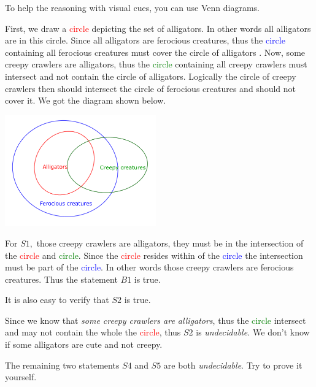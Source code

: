 \documentclass{article}
\begin{document}
\begin{soln}
    To help the reasoning with visual cues, you can use Venn diagrams.
    
    First, we draw a \textcolor{red}{circle} depicting the set of alligators. In other words all alligators are in this circle.
    Since all alligators are ferocious creatures, thus the \textcolor{blue}{circle} containing all ferocious creatures must cover the circle of alligators .
    Now, some creepy crawlers are alligators, thus the \textcolor{green}{circle} containing all creepy crawlers must intersect and not contain the circle of alligators.
    Logically the circle of creepy crawlers then should intersect the circle of ferocious creatures and should not cover it.
    We got the diagram shown below.

    \begin{center}
        \includegraphics[width=6.5cm]{./svg/pdf/pi-2023-01-03.pdf}
    \end{center}
    
    For $S1,$ those creepy crawlers are alligators, they must be in the intersection of the \textcolor{red}{circle} and \textcolor{green}{circle}.
    Since the \textcolor{red}{circle} resides within of the \textcolor{blue}{circle} the intersection must be part of the \textcolor{blue}{circle}.
    In other words those creepy crawlers are ferocious creatures. Thus the statement $B1$ is true.

    It is also easy to verify that $S2$ is true.

    Since we know that \textit{some creepy crawlers are alligators}, thus the \textcolor{green}{circle} intersect
    and may not contain the whole the \textcolor{red}{circle}, thus $S2$ is \textit{undecidable.}
    We don't know if some alligators are cute and not creepy.

    The remaining two statements $S4$ and $S5$ are both \textit{undecidable}. Try to prove it yourself.
\end{soln}

\newpage
\end{document}

